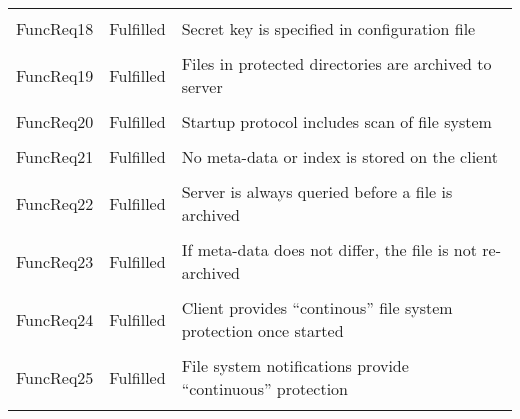 \begin{longtable}{ l l p{5cm} }
    \\ \\
    FuncReq18           & Fulfilled                 & Secret key is
                                                      specified in
                                                      configuration file
    \\ \\
    FuncReq19           & Fulfilled                 & Files in protected
                                                      directories are
                                                      archived to server
    \\ \\
    FuncReq20           & Fulfilled                 & Startup protocol
                                                      includes scan of
                                                      file system
    \\ \\
    FuncReq21           & Fulfilled                 & No meta-data or index
                                                      is stored on the
                                                      client
    \\ \\
    FuncReq22           & Fulfilled                 & Server is always
                                                      queried before a file
                                                      is archived
    \\ \\
    FuncReq23           & Fulfilled                 & If meta-data does not
                                                      differ, the file is
                                                      not re-archived
    \\ \\
    FuncReq24           & Fulfilled                 & Client provides
                                                      ``continous'' file
                                                      system protection
                                                      once started
    \\ \\
    FuncReq25           & Fulfilled                 & File system
                                                      notifications provide
                                                      ``continuous''
                                                      protection
    \\ \\

\end{longtable}
